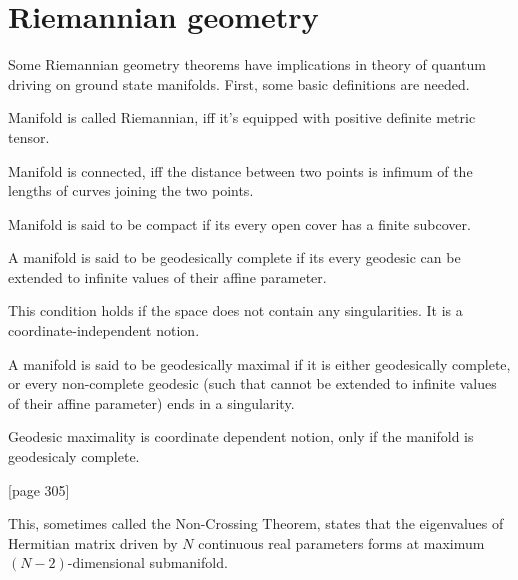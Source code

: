 
\section{Riemannian geometry}
Some Riemannian geometry theorems have implications in theory of quantum driving on ground state manifolds. First, some basic definitions are needed.

\begin{definition}
    Manifold is called Riemannian, iff it's equipped with positive definite metric tensor.
\end{definition}
\begin{definition}
    Manifold is connected, iff the distance between two points is infimum of the lengths of curves joining the two points.
\end{definition}
\begin{definition}
    Manifold is said to be compact if its every open cover has a finite subcover.
\end{definition}
\begin{definition}
    A manifold is said to be geodesically complete if its every geodesic can be extended to infinite values of their affine parameter. 
\end{definition}
This condition holds if the space does not contain any singularities. It is a coordinate-independent notion.
\begin{definition}
    A manifold is said to be geodesically maximal if it is either geodesically complete, or every non-complete geodesic (such that cannot be extended to infinite values of their affine parameter) ends in a singularity.
\end{definition}
Geodesic maximality is coordinate dependent notion, only if the manifold is geodesicaly complete.


\begin{thm}\citep{landau}[page 305]
    \label{thm:n-2}

    This, sometimes called the Non-Crossing Theorem, states that the eigenvalues of Hermitian matrix driven by $N$ continuous real parameters forms at maximum $(N-2)$-dimensional submanifold.
\end{thm}


